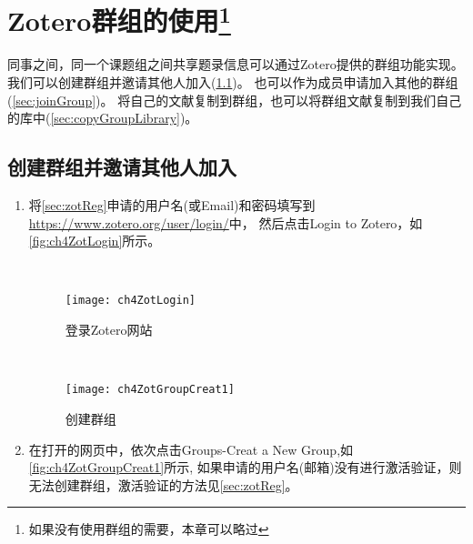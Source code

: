 \documentclass[cn,11pt,chinese]{elegantbook}
\begin{document}
  \chapter[Zotero群组的使用]{Zotero群组的使用\footnote{如果没有使用群组的需要，本章可以略过}}\label{ch:group}
同事之间，同一个课题组之间共享题录信息可以通过Zotero提供的群组功能实现。
我们可以创建群组并邀请其他人加入(\cref{sec:CreatGroup})。
也可以作为成员申请加入其他的群组(\cref{sec:joinGroup})。
将自己的文献复制到群组，也可以将群组文献复制到我们自己的库中(\cref{sec:copyGroupLibrary})。
   
\section{创建群组并邀请其他人加入}\label{sec:CreatGroup}
\begin{enumerate}
	\item    将\cref{sec:zotReg}申请的用户名(或Email)和密码填写到\url{https://www.zotero.org/user/login/}中，
	然后点击Login to Zotero，如\autoref{fig:ch4ZotLogin}所示\label{page:zoteroLogin}。
		\begin{figure}[htbp]
			\centering\
			\begin{minipage}[t]{0.6\linewidth}
				\centering
				\texttt{[image: ch4ZotLogin]}
				\caption{登录Zotero网站}
				\label{fig:ch4ZotLogin}
			\end{minipage}
			\centering\
			\begin{minipage}[t]{0.3\linewidth}
				\centering
				\texttt{[image: ch4ZotGroupCreat1]}
				\caption{创建群组}
				\label{fig:ch4ZotGroupCreat1}
			\end{minipage}
		\end{figure}
	
	\item 在打开的网页中，依次点击Groups-Creat a New Group,如\autoref{fig:ch4ZotGroupCreat1}所示,
	如果申请的用户名(邮箱)没有进行激活验证，则无法创建群组，激活验证的方法见\cref{sec:zotReg}。
	

\end{enumerate}
\end{document}
